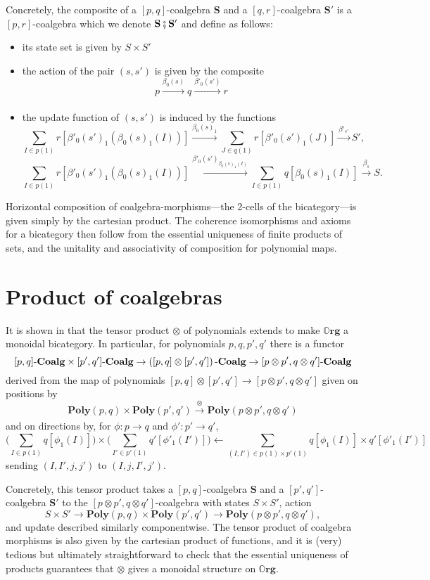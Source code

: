 \documentclass[11pt, one side, article]{memoir}
\theoremstyle{definition}
\theoremstyle{plain}
\newcommand{\Cat}[1]{\mathbf{#1}}%
\newcommand{\then}{\mathbin{\fatsemi}}
\newcommand{\To}[2][]{\xrightarrow[#1]{#2}}
\newcommand{\fromm}{\longleftarrow}
\newcommand{\tn}[1]{\textnormal{#1}}
\newcommand{\poly}{\Cat{Poly}}
\newcommand{\0}{\textsf{0}}
\newcommand{\1}{\tn{\textsf{1}}}
\newcommand{\coalg}{\tn{-}\Cat{Coalg}}
\newcommand{\org}{{\mathbb{O}\Cat{rg}}}
\renewcommand{\S}{{\Cat{S}}}
\begin{document}
Concretely, the composite of a $[p,q]$-coalgebra $\S$ and a $[q,r]$-coalgebra $\S'$ is a $[p,r]$-coalgebra which we denote $\S\then\S'$  and define as follows:
\begin{itemize}
	\item its state set is given by $S \times S'$
	\item the action of the pair $(s,s')$ is given by the composite 
\[p \To{\beta_0(s)} q \To{\beta'_0(s')} r\]
	\item the update function of $(s,s')$ is induced by the functions
\[\sum_{I \in p(1)} r[\beta'_0(s')_1(\beta_0(s)_1(I))] \To{\beta_0(s)_1} \sum_{J \in q(1)} r[\beta'_0(s')_1(J)] \To{\beta'_{s'}} S',\]
\[\sum_{I \in p(1)} r[\beta'_0(s')_1(\beta_0(s)_1(I))] \To{\beta'_0(s')_{\beta_0(s)_1(I)}} \sum_{I \in p(1)} q[\beta_0(s)_1(I)] \To{\beta_s} S.\]%
\end{itemize}
Horizontal composition of coalgebra-morphisms---the 2-cells of the bicategory---is given simply by the cartesian product. The coherence isomorphisms and axioms for a bicategory then follow from the essential uniqueness of finite products of sets, and the unitality and associativity of composition for polynomial maps.%



\section{Product of coalgebras}


It is shown in \cite[Proposition 2.13]{spivak2021learners} that the tensor product $\otimes$ of polynomials extends to make $\org$ a monoidal bicategory. In particular, for polynomials $p,q,p',q'$ there is a functor
\[[p,q]\coalg \times [p',q']\coalg \to \left([p,q] \otimes [p',q']\right)\coalg \to [p \otimes p',q \otimes q']\coalg\]
derived from the map of polynomials $[p,q] \otimes [p',q'] \to [p {\otimes} p',q {\otimes} q']$ given on positions by 
\[\poly(p,q) \times \poly(p',q') \To{\otimes} \poly(p \otimes p',q \otimes q')\]
and on directions by, for $\phi\colon p \to q$ and $\phi'\colon p' \to q'$,
\[\bigg(\sum_{I \in p(1)} q[\phi_1(I)]\bigg) \times \bigg(\sum_{I' \in p'(1)} q'[\phi'_1(I')]\bigg) \fromm \sum_{(I,I') \in p(1) \times p'(1)} q[\phi_1(I)] \times q'[\phi'_1(I')]\]
sending $(I,I',j,j')$ to $(I,j,I',j')$.

Concretely, this tensor product takes a $[p,q]$-coalgebra $\S$ and a $[p',q']$-coalgebra $\S'$ to the $[p \otimes p',q \otimes q']$-coalgebra with states $S \times S'$, action
\[S \times S' \to \poly(p,q) \times \poly(p',q') \to \poly(p \otimes p',q \otimes q'),\]
and update described similarly componentwise. The tensor product of coalgebra morphisms is also given by the cartesian product of functions, and it is (very) tedious but ultimately straightforward to check that the essential uniqueness of products guarantees that $\otimes$ gives a monoidal structure on $\org$.
\end{document}
